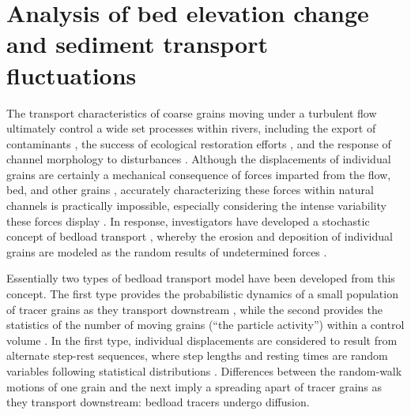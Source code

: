 
\chapter{Analysis of bed elevation change and sediment transport fluctuations}
\label{ch:ch3}

The transport characteristics of coarse grains moving under a turbulent flow ultimately control a wide set processes within rivers, including the export of contaminants \citep{Malmon2005,Macklin2006}, the success of ecological restoration efforts \citep{Gaeuman2017}, and the response of channel morphology to disturbances \citep{Hassan2017}.
Although the displacements of individual grains are certainly a mechanical consequence of forces imparted from the flow, bed, and other grains \citep{Wiberg1985, Vowinckel2014,Gonzalez2017}, accurately characterizing these forces within natural channels is practically impossible, especially considering the intense variability these forces display \citep{Schmeeckle2007,Celik2010, Dwivedi2011}. In response, investigators have developed a stochastic concept of bedload transport \citep{Einstein1937}, whereby the erosion and deposition of individual grains are modeled as the random results of undetermined forces \citep{Einstein1950,Paintal1971,Ancey2006}.

Essentially two types of bedload transport model have been developed from this concept. 
The first type provides the probabilistic dynamics of a small population of tracer grains as they transport downstream \citep{Einstein1937,Hubbell1964, Nakagawa1976,Martin2012,Lajeunesse2017,Wu2019}, while the second provides the statistics of the number of moving grains (``the particle activity'') within a control volume \citep{Einstein1950,Ancey2006,Ancey2008,Furbish2012a}.
In the first type, individual displacements are considered to result from alternate step-rest sequences, where step lengths and resting times are random variables following statistical distributions \citep{Einstein1937}. 
Differences between the random-walk motions of one grain and the next imply a spreading apart of tracer grains as they transport downstream: bedload tracers undergo diffusion.

